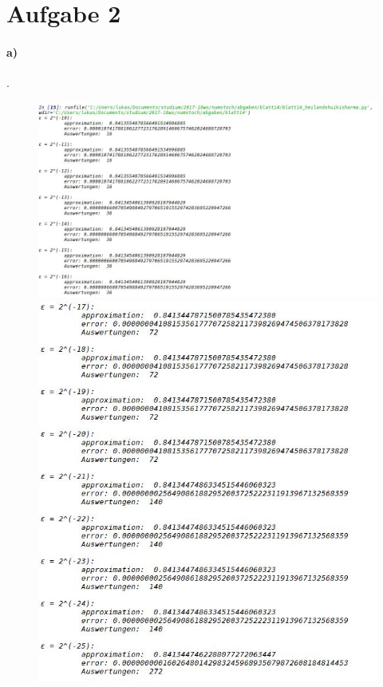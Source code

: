 \documentclass{article}
\begin{document}
	
	
	\section*{Aufgabe 2}
		\paragraph*{a)}.
			\begin{figure}[h!]
				\includegraphics[scale=0.6]{aufgabe2part1.jpg}
				\includegraphics[scale=0.6]{aufgabe2part2.jpg}

\end{figure}
\end{document}
